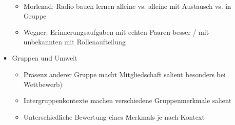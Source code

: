 \documentclass[11pt, paper=a4, twocolumn]{scrartcl}
\begin{document}
\begin{itemize}
\begin{itemize}
					\item Morlenad: Radio bauen lernen alleine vs. alleine mit Austausch vs. in Gruppe
					\item Wegner: Erinnerungsaufgaben mit echten Paaren besser / mit unbekannten mit Rollenaufteilung
				\end{itemize}
			\item Gruppen und Umwelt
				\begin{itemize}
					\item Präsenz anderer Gruppe macht Mitgliedschaft salient besonders bei Wettbewerb)
					\item Intergruppenkontexte machen verschiedene Gruppenmerkmale salient
					\item Unterschiedliche Bewertung eines Merkmals je nach Kontext
				\end{itemize}
		\end{itemize}
\end{document}

